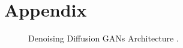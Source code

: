\documentclass[10pt,twocolumn,letterpaper]{article}
\begin{document}
\newpage
{\small


}


\appendix
\section{Appendix}

\begin{figure}[h]
    \centering

    \caption{Denoising Diffusion GANs Architecture \cite{Xiao22}.}
    \label{fig:intro-1}
\end{figure}
\end{document}
